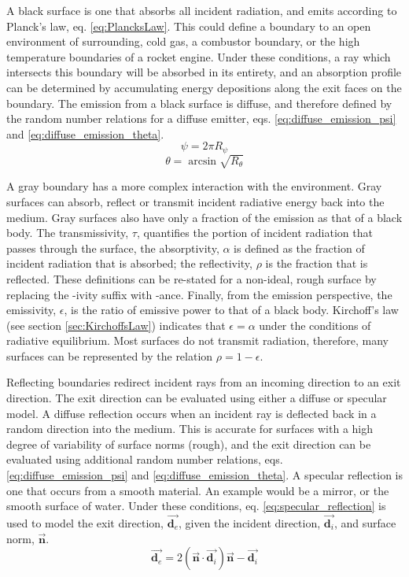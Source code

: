 A black surface is one that absorbs all incident radiation, and emits according to Planck's law, eq. \ref{eq:PlancksLaw}. 
This could define a boundary to an open environment of surrounding, cold gas, a combustor boundary, or the high temperature boundaries of a rocket engine. 
Under these conditions, a ray which intersects this boundary will be absorbed in its entirety, and an absorption profile can be determined by accumulating energy depositions along the exit faces on the boundary. The emission from a black surface is diffuse, and therefore defined by the random number relations for a diffuse emitter, eqs. \ref{eq:diffuse_emission_psi} and \ref{eq:diffuse_emission_theta}.
\begin{equation}
    \psi{}=2\pi{}R_\psi
    \label{eq:diffuse_emission_psi}
\end{equation}
\begin{equation}
    \theta = \arcsin{\sqrt{R_\theta}}
    \label{eq:diffuse_emission_theta}
\end{equation}

A gray boundary has a more complex interaction with the environment. Gray surfaces can absorb, reflect or transmit incident radiative energy back into the medium. Gray surfaces also have only a fraction of the emission as that of a black body.
The transmissivity, $\tau{}$, quantifies the portion of incident radiation that passes through the surface, the absorptivity, $\alpha$ is defined as the fraction of incident radiation that is absorbed; the reflectivity, $\rho$ is the fraction that is reflected. These definitions can be re-stated for a non-ideal, rough surface by replacing the -ivity suffix with -ance. 
Finally, from the emission perspective, the emissivity, $\epsilon$, is the ratio of emissive power to that of a black body.  Kirchoff's law (see section \ref{sec:KirchoffsLaw}) indicates that $\epsilon{}=\alpha{}$ under the conditions of radiative equilibrium.
Most surfaces do not transmit radiation, therefore, many surfaces can be represented by the relation $\rho{}=1-\epsilon$. 

Reflecting boundaries redirect incident rays from an incoming direction to an exit direction. 
The exit direction can be evaluated using either a diffuse or specular model. 
A diffuse reflection occurs when an incident ray is deflected back in a random direction into the medium. This is accurate for surfaces with a high degree of variability of surface norms (rough), and the exit direction can be evaluated using additional random number relations, eqs. \ref{eq:diffuse_emission_psi} and \ref{eq:diffuse_emission_theta}.
A specular reflection is one that occurs from a smooth material. 
An example would be a mirror, or the smooth surface of water. Under these conditions, eq. \ref{eq:specular_reflection} is used to model the exit direction, $\Vec{\textbf{d}_{e}}$, given the incident direction, $\Vec{\textbf{d}_i}$, and surface norm, $\vec{\textbf{n}}$.
\begin{equation}
    \Vec{\textbf{d}_e}=2(\Vec{\textbf{n}}\cdot\Vec{\textbf{d}_i})\Vec{\textbf{n}} -\Vec{\textbf{d}_i}
    \label{eq:specular_reflection}
\end{equation}
 


